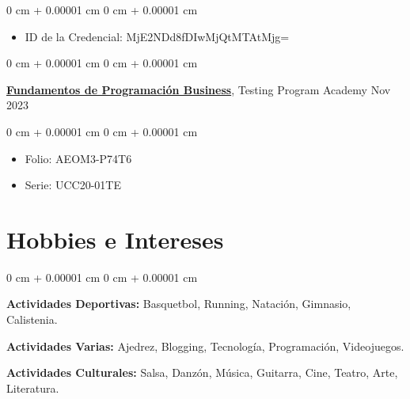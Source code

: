 \documentclass[10pt, letterpaper]{article}
\newenvironment{highlights}{
    \begin{itemize}[
        topsep=0.10 cm,
        parsep=0.10 cm,
        partopsep=0pt,
        itemsep=0pt,
        leftmargin=0 cm + 10pt
    ]
}{
    \end{itemize}
} %
\newenvironment{onecolentry}{
    \begin{adjustwidth}{
        0 cm + 0.00001 cm
    }{
        0 cm + 0.00001 cm
    }
}{
    \end{adjustwidth}
} %
\newenvironment{twocolentry}[2][]{
    \onecolentry
    \def\secondColumn{#2}
    \setcolumnwidth{\fill, 4.5 cm}
    \begin{paracol}{2}
}{
    \switchcolumn \raggedleft \secondColumn
    \end{paracol}
    \endonecolentry
} %
\newenvironment{threecolentry}[3][]{
    \onecolentry
    \def\thirdColumn{#3}
    \setcolumnwidth{, \fill, 4.5 cm}
    \begin{paracol}{3}
    {\raggedright #2} \switchcolumn
}{
    \switchcolumn \raggedleft \thirdColumn
    \end{paracol}
    \endonecolentry
} %
\begin{document}
        \vspace{0.10 cm}
        \begin{onecolentry}
            \begin{highlights}
                \item ID de la Credencial: MjE2NDd8fDIwMjQtMTAtMjg=
            \end{highlights}
        \end{onecolentry}

        \begin{twocolentry}{
            Nov 2023
        }
            \href{https://testingprogram.com.mx/validar/}{\textbf{Fundamentos de Programación Business}}, Testing Program Academy\end{twocolentry}

        \vspace{0.10 cm}
        \begin{onecolentry}
            \begin{highlights}
                \item Folio: AEOM3-P74T6
                \item Serie: UCC20-01TE
            \end{highlights}
        \end{onecolentry}

 \section{Hobbies e Intereses}

\begin{threecolentry}{
    \textbf{Actividades Deportivas:} Basquetbol, Running, Natación, Gimnasio, Calistenia.
}{
    \textbf{Actividades Culturales:} Salsa, Danzón, Música, Guitarra, Cine, Teatro, Arte, Literatura. 
}{
    \textbf{Actividades Varias:} Ajedrez, Blogging, Tecnología, Programación, Videojuegos.
}
\end{threecolentry}
\end{document}
